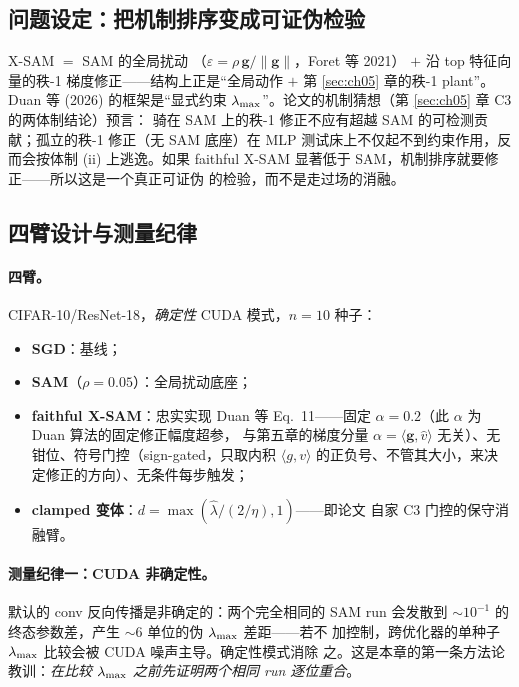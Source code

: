 \subsection{问题设定：把机制排序变成可证伪检验}
\label{sec:ch06-question}

X-SAM $=$ SAM 的全局扰动
（$\varepsilon=\rho\,\mathbf{g}/\|\mathbf{g}\|$，Foret 等 2021）
$+$ 沿 top 特征向量的秩-1 梯度修正——结构上正是``全局动作 $+$ 第
\ref{sec:ch05} 章的秩-1 plant''。Duan 等 (2026) 的框架是``显式约束
$\lambda_{\max}$''。论文的机制猜想（第 \ref{sec:ch05} 章 C3 的两体制结论）预言：
骑在 SAM 上的秩-1 修正不应有超越 SAM 的可检测贡献；孤立的秩-1 修正（无
SAM 底座）在 MLP 测试床上不仅起不到约束作用，反而会按体制 (ii) 上逃逸。如果
faithful X-SAM 显著低于 SAM，机制排序就要修正——所以这是一个真正可证伪
的检验，而不是走过场的消融。

\subsection{四臂设计与测量纪律}
\label{sec:ch06-design}

\paragraph{四臂。}CIFAR-10/ResNet-18，\emph{确定性} CUDA 模式，$n{=}10$
种子：
\begin{itemize}
  \item \textbf{SGD}：基线；
  \item \textbf{SAM}（$\rho{=}0.05$）：全局扰动底座；
  \item \textbf{faithful X-SAM}：忠实实现 Duan 等 Eq.~11——固定
        $\alpha{=}0.2$（此 $\alpha$ 为 Duan 算法的固定修正幅度超参，
        与第五章的梯度分量 $\alpha=\langle\mathbf{g},\hat v\rangle$
        无关）、无钳位、符号门控（sign-gated，只取内积
        $\langle g,v\rangle$ 的正负号、不管其大小，来决定修正的方向）、无条件每步触发；
  \item \textbf{clamped 变体}：$d=\max(\hat\lambda/(2/\eta),1)$——即论文
        自家 C3 门控的保守消融臂。
\end{itemize}

\paragraph{测量纪律一：CUDA 非确定性。}
默认的 conv 反向传播是非确定的：两个完全相同的 SAM run 会发散到
$\sim10^{-1}$ 的终态参数差，产生 $\sim6$ 单位的伪 $\lambda_{\max}$ 差距——若不
加控制，跨优化器的单种子 $\lambda_{\max}$ 比较会被 CUDA 噪声主导。确定性模式消除
之。这是本章的第一条方法论教训：\emph{在比较 $\lambda_{\max}$ 之前先证明两个相同
 run 逐位重合}。

